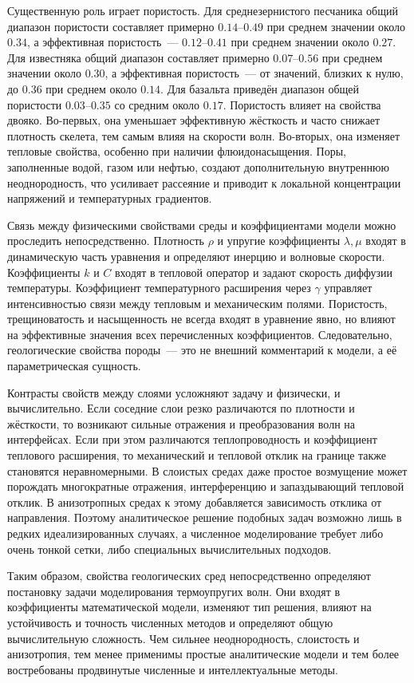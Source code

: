 Существенную роль играет пористость. Для среднезернистого песчаника общий диапазон пористости составляет примерно $0.14$--$0.49$ при среднем значении около $0.34$, а эффективная пористость~--- $0.12$--$0.41$ при среднем значении около $0.27$. Для известняка общий диапазон составляет примерно $0.07$--$0.56$ при среднем значении около $0.30$, а эффективная пористость~--- от значений, близких к нулю, до $0.36$ при среднем около $0.14$. Для базальта приведён диапазон общей пористости $0.03$--$0.35$ со средним около $0.17$. Пористость влияет на свойства двояко. Во-первых, она уменьшает эффективную жёсткость и часто снижает плотность скелета, тем самым влияя на скорости волн. Во-вторых, она изменяет тепловые свойства, особенно при наличии флюидонасыщения. Поры, заполненные водой, газом или нефтью, создают дополнительную внутреннюю неоднородность, что усиливает рассеяние и приводит к локальной концентрации напряжений и температурных градиентов.

Связь между физическими свойствами среды и коэффициентами модели можно проследить непосредственно. Плотность $\rho$ и упругие коэффициенты $\lambda,\mu$ входят в динамическую часть уравнения и определяют инерцию и волновые скорости. Коэффициенты $k$ и $C$ входят в тепловой оператор и задают скорость диффузии температуры. Коэффициент температурного расширения через $\gamma$ управляет интенсивностью связи между тепловым и механическим полями. Пористость, трещиноватость и насыщенность не всегда входят в уравнение явно, но влияют на эффективные значения всех перечисленных коэффициентов. Следовательно, геологические свойства породы~--- это не внешний комментарий к модели, а её параметрическая сущность.

Контрасты свойств между слоями усложняют задачу и физически, и вычислительно. Если соседние слои резко различаются по плотности и жёсткости, то возникают сильные отражения и преобразования волн на интерфейсах. Если при этом различаются теплопроводность и коэффициент теплового расширения, то механический и тепловой отклик на границе также становятся неравномерными. В слоистых средах даже простое возмущение может порождать многократные отражения, интерференцию и запаздывающий тепловой отклик. В анизотропных средах к этому добавляется зависимость отклика от направления. Поэтому аналитическое решение подобных задач возможно лишь в редких идеализированных случаях, а численное моделирование требует либо очень тонкой сетки, либо специальных вычислительных подходов.

Таким образом, свойства геологических сред непосредственно определяют постановку задачи моделирования термоупругих волн. Они входят в коэффициенты математической модели, изменяют тип решения, влияют на устойчивость и точность численных методов и определяют общую вычислительную сложность. Чем сильнее неоднородность, слоистость и анизотропия, тем менее применимы простые аналитические модели и тем более востребованы продвинутые численные и интеллектуальные методы.


